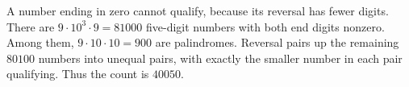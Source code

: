 A number ending in zero cannot qualify, because its reversal has fewer digits. There are $9\cdot10^3\cdot9=81000$ five-digit numbers with both end digits nonzero. Among them, $9\cdot10\cdot10=900$ are palindromes. Reversal pairs up the remaining $80100$ numbers into unequal pairs, with exactly the smaller number in each pair qualifying. Thus the count is $\boxed{40050}$.
